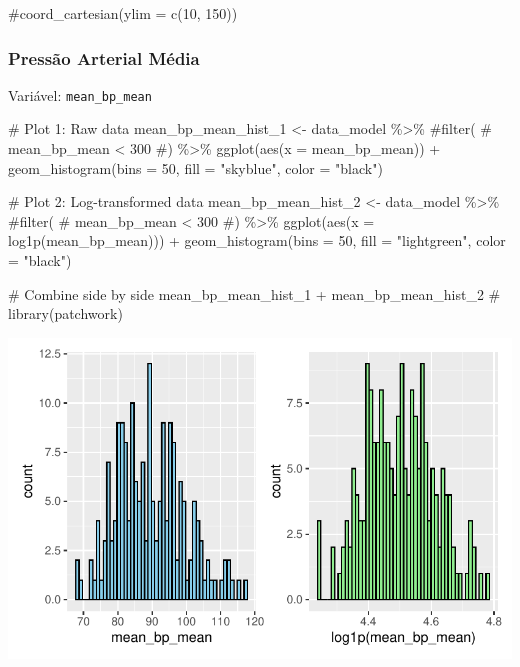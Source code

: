 \documentclass[
  12pt,
]{article}
\newenvironment{Shaded}{\begin{snugshade}}{\end{snugshade}}
\newcommand{\AttributeTok}[1]{\textcolor[rgb]{0.40,0.45,0.13}{#1}}
\newcommand{\CommentTok}[1]{\textcolor[rgb]{0.37,0.37,0.37}{#1}}
\newcommand{\DecValTok}[1]{\textcolor[rgb]{0.68,0.00,0.00}{#1}}
\newcommand{\FunctionTok}[1]{\textcolor[rgb]{0.28,0.35,0.67}{#1}}
\newcommand{\NormalTok}[1]{\textcolor[rgb]{0.00,0.23,0.31}{#1}}
\newcommand{\OtherTok}[1]{\textcolor[rgb]{0.00,0.23,0.31}{#1}}
\newcommand{\SpecialCharTok}[1]{\textcolor[rgb]{0.37,0.37,0.37}{#1}}
\newcommand{\StringTok}[1]{\textcolor[rgb]{0.13,0.47,0.30}{#1}}
\begin{document}
\begin{Shaded}
\begin{Highlighting}[]
    \CommentTok{\#coord\_cartesian(ylim = c(10, 150))}
\end{Highlighting}
\end{Shaded}

\subsubsection{Pressão Arterial
Média}\label{pressuxe3o-arterial-muxe9dia}

Variável: \texttt{mean\_bp\_mean}

\begin{Shaded}
\begin{Highlighting}[]
\CommentTok{\# Plot 1: Raw data}
\NormalTok{mean\_bp\_mean\_hist\_1 }\OtherTok{\textless{}{-}}\NormalTok{ data\_model }\SpecialCharTok{\%\textgreater{}\%} 
    \CommentTok{\#filter(}
    \CommentTok{\#    mean\_bp\_mean \textless{} 300}
    \CommentTok{\#) \%\textgreater{}\% }
    \FunctionTok{ggplot}\NormalTok{(}\FunctionTok{aes}\NormalTok{(}\AttributeTok{x =}\NormalTok{ mean\_bp\_mean)) }\SpecialCharTok{+} 
    \FunctionTok{geom\_histogram}\NormalTok{(}\AttributeTok{bins =} \DecValTok{50}\NormalTok{, }\AttributeTok{fill =} \StringTok{"skyblue"}\NormalTok{, }\AttributeTok{color =} \StringTok{"black"}\NormalTok{)}

\CommentTok{\# Plot 2: Log{-}transformed data}
\NormalTok{mean\_bp\_mean\_hist\_2 }\OtherTok{\textless{}{-}}\NormalTok{ data\_model }\SpecialCharTok{\%\textgreater{}\%} 
    \CommentTok{\#filter(}
    \CommentTok{\#    mean\_bp\_mean \textless{} 300}
    \CommentTok{\#) \%\textgreater{}\%}
    \FunctionTok{ggplot}\NormalTok{(}\FunctionTok{aes}\NormalTok{(}\AttributeTok{x =} \FunctionTok{log1p}\NormalTok{(mean\_bp\_mean))) }\SpecialCharTok{+} 
    \FunctionTok{geom\_histogram}\NormalTok{(}\AttributeTok{bins =} \DecValTok{50}\NormalTok{, }\AttributeTok{fill =} \StringTok{"lightgreen"}\NormalTok{, }\AttributeTok{color =} \StringTok{"black"}\NormalTok{)}

\CommentTok{\# Combine side by side}
\NormalTok{mean\_bp\_mean\_hist\_1 }\SpecialCharTok{+}\NormalTok{ mean\_bp\_mean\_hist\_2 }\CommentTok{\# library(patchwork)}
\end{Highlighting}
\end{Shaded}

\includegraphics{Outcomes_files/figure-pdf/mean_bp_mean_1-1.pdf}
\end{document}
